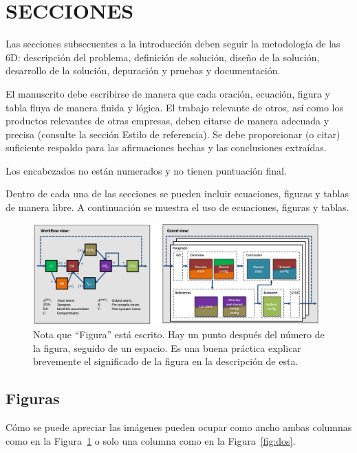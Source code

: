\documentclass{IEEEcsmag}
\begin{document}
\section{SECCIONES}
Las secciones subsecuentes a la introducción deben seguir la metodología de las 6D: descripción del problema, definición de solución,  diseño de la solución, desarrollo de la solución, depuración y pruebas y documentación.
 
El manuscrito debe escribirse de manera que cada oración, ecuación, figura y tabla fluya de manera fluida y lógica. El trabajo relevante de otros, así como los productos relevantes de otras empresas, deben citarse de manera adecuada y precisa (consulte la sección Estilo de referencia). Se debe proporcionar (o citar) suficiente respaldo para las afirmaciones hechas y las conclusiones extraídas.

Los encabezados no están numerados y no tienen puntuación final.

Dentro de cada una de las secciones se pueden incluir ecuaciones, figuras y tablas de manera libre. A continuación se muestra el uso de ecuaciones, figuras y tablas.

\begin{figure}[t]
\centerline{\includegraphics[width=26pc]{./latex-imagenes/fig2.jpg}}
\caption{Nota que ``Figura'' está escrito. Hay un punto después del número de la figura, seguido de un espacio. Es una buena práctica explicar brevemente el significado de la figura en la descripción de esta.}\vspace*{-5pt}
\label{fig:uno}
\end{figure}

\subsection{Figuras}
Cómo se puede apreciar las imágenes pueden ocupar como ancho ambas columnas como en la Figura~\ref{fig:uno} o solo una columna como  en la Figura~\ref{fig:dos}.
\end{document}
